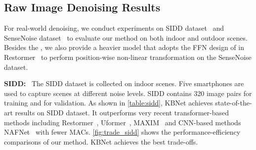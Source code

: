 \documentclass[default,iicol]{sn-jnl}
\theoremstyle{thmstyleone}\newtheorem{theorem}{Theorem}\newtheorem{proposition}[theorem]{Proposition}
\theoremstyle{thmstyletwo}\newtheorem{example}{Example}\newtheorem{remark}{Remark}
\theoremstyle{thmstylethree}\newtheorem{definition}{Definition}
\begin{document}
\subsection{Raw Image Denoising Results}
For real-world denoising, we conduct experiments on SIDD dataset~\cite{sidd} and SenseNoise dataset~\cite{zhang2021IDR} to evaluate our method on both indoor and outdoor scenes.
Besides the , we also provide a heavier model  that adopts the FFN design of in Restormer~\cite{restormer} to perform position-wise non-linear transformation on the SenseNoise dataset.

\noindent\textbf{SIDD:}~
The SIDD dataset is collected on indoor scenes. Five smartphones are used to capture scenes at different noise levels. SIDD contains 320 image pairs for training and  for validation.
As shown in \cref{table:sidd}, KBNet achieves state-of-the-art results on  SIDD dataset. It outperforms very recent transformer-based methods including Restormer~\cite{restormer}, Uformer~\cite{wang2021uformer}, MAXIM~\cite{tu2022maxim} and CNN-based methods NAFNet~\cite{chen2022nafnet} with fewer MACs. \cref{fig:trade_sidd} shows the performance-efficiency comparisons of our method. KBNet achieves the best trade-offs.
\end{document}
